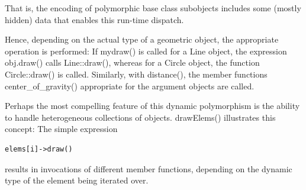 \begin{tcolorbox}[colback=webgreen!5!white,colframe=webgreen!75!black]
\hspace*{0.75cm}That is, the encoding of polymorphic base class subobjects includes some (mostly hidden) data that enables this run-time dispatch.
\end{tcolorbox}

Hence, depending on the actual type of a geometric object, the appropriate operation is performed: If mydraw() is called for a Line object, the expression obj.draw() calls Line::draw(), whereas for a Circle object, the function Circle::draw() is called. Similarly, with distance(), the member functions center\_of\_gravity() appropriate for the argument objects are called.

Perhaps the most compelling feature of this dynamic polymorphism is the ability to handle heterogeneous collections of objects. drawElems() illustrates this concept: The simple expression

\begin{lstlisting}[style=styleCXX]
elems[i]->draw()
\end{lstlisting}

results in invocations of different member functions, depending on the dynamic type of the element being iterated over.


























